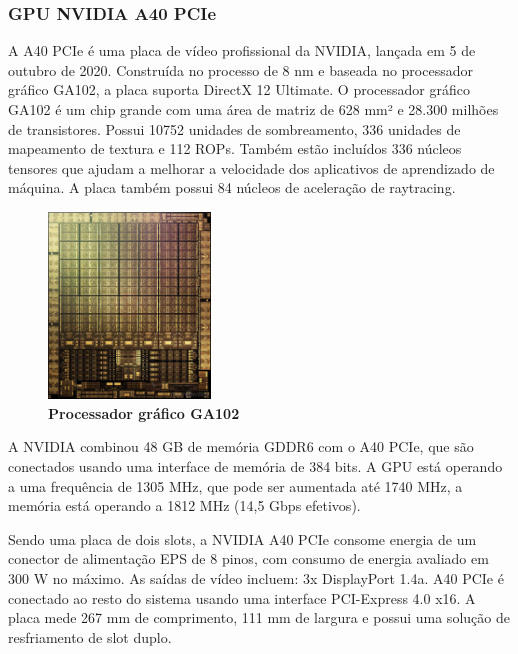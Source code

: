\documentclass[conference]{IEEEtran}
\begin{document}
\subsubsection{GPU NVIDIA A40 PCIe}
\par A A40 PCIe é uma placa de vídeo profissional da NVIDIA, lançada em 5 de outubro de 2020. Construída no processo de 8 nm e baseada no processador gráfico GA102, a placa suporta DirectX 12 Ultimate. O processador gráfico GA102 é um chip grande com uma área de matriz de 628 mm² e 28.300 milhões de transistores. Possui 10752 unidades de sombreamento, 336 unidades de mapeamento de textura e 112 ROPs. Também estão incluídos 336 núcleos tensores que ajudam a melhorar a velocidade dos aplicativos de aprendizado de máquina. A placa também possui 84 núcleos de aceleração de raytracing. 

\begin{figure}[h]
\centerline{\includegraphics[width = 1.7in]{a40_imagem.jpg}}
\caption{\textbf{Processador gráfico GA102}}
\label{figAM9300}
\end{figure}

\par A NVIDIA combinou 48 GB de memória GDDR6 com o A40 PCIe, que são conectados usando uma interface de memória de 384 bits. A GPU está operando a uma frequência de 1305 MHz, que pode ser aumentada até 1740 MHz, a memória está operando a 1812 MHz (14,5 Gbps efetivos).
\par Sendo uma placa de dois slots, a NVIDIA A40 PCIe consome energia de um conector de alimentação EPS de 8 pinos, com consumo de energia avaliado em 300 W no máximo. As saídas de vídeo incluem: 3x DisplayPort 1.4a. A40 PCIe é conectado ao resto do sistema usando uma interface PCI-Express 4.0 x16. A placa mede 267 mm de comprimento, 111 mm de largura e possui uma solução de resfriamento de slot duplo.
\end{document}
